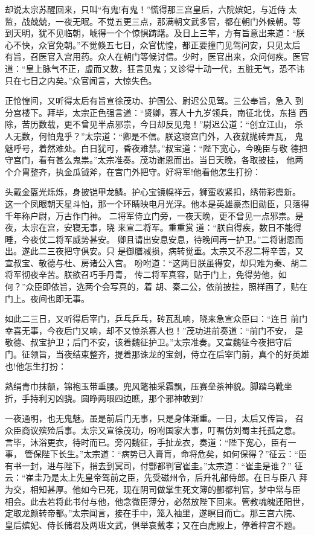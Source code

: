却说太宗苏醒回来，只叫“有鬼!有鬼！”慌得那三宫皇后，六院嫔妃，与近侍
太监，战兢兢，一夜无眠。不觉五更三点，那满朝文武多官，都在朝门外候朝。等
到天明，犹不见临朝，唬得一个个惊惧踌躇。及日上三竿，方有旨意出来道：“朕
心不快，众官免朝。”不觉倏五七日，众官忧惶，都正要撞门见驾问安，只见太后
有旨，召医官入宫用药。众人在朝门等候讨信。少时，医官出来，众问何疾。医官
道：“皇上脉气不正，虚而又数，狂言见鬼；又诊得十动一代，五脏无气，恐不讳
只在七日之内矣。”众官闻言，大惊失色。

正怆惶间，又听得太后有旨宣徐茂功、护国公、尉迟公见驾。三公奉旨，急入
到分宫楼下。拜毕，太宗正色强言道：“贤卿，寡人十九岁领兵，南征北伐，东挡
西除，苦历数载，更不曾见半点邪祟，今日却反见鬼！”尉迟公道：“创立江山，
杀人无数，何怕鬼乎？”太宗道：“卿是不信。朕这寝宫门外，入夜就抛砖弄瓦，
鬼魅呼号，着然难处。白日犹可，昏夜难禁。”叔宝道：“陛下宽心，今晚臣与敬
德把守宫门，看有甚么鬼祟。”太宗准奏。茂功谢恩而出。当日天晚，各取披挂，
他两个介胄整齐，执金瓜钺斧，在宫门外把守。好将军!他看他怎生打扮：

头戴金盔光烁烁，身披铠甲龙鳞。护心宝镜幌祥云，狮蛮收紧扣，绣带彩霞新。
这一个凤眼朝天星斗怕，那一个环睛映电月光浮。他本是英雄豪杰旧勋臣，只落得
千年称户尉，万古作门神。
二将军侍立门旁，一夜天晚，更不曾见一点邪祟。是夜，太宗在宫，安寝无事，晓
来宣二将军。重重赏道：“朕自得疾，数日不能得睡，今夜仗二将军威势甚安。
卿且请出安息安息，待晚间再一护卫。”二将谢恩而出。遂此二三夜把守俱安。只
是御膳减损，病转觉重。太宗又不忍二将辛苦，又宣叔宝、敬德与杜、房诸公入宫。
吩咐道：“这两日朕虽得安，却只难为秦、胡二将军彻夜辛苦。朕欲召巧手丹青，
传二将军真容，贴于门上，免得劳他，如何？”众臣即依旨，选两个会写真的，着
胡、秦二公，依前披挂，照样画了，贴在门上。夜间也即无事。

如此二三日，又听得后宰门，乒乓乒乓，砖瓦乱响，晓来急宣众臣曰：“连日
前门幸喜无事，今夜后门又响，却不又惊杀寡人也！”茂功进前奏道：“前门不安，
是敬德、叔宝护卫；后门不安，该着魏征护卫。”太宗准奏。又宣魏征今夜把守后
门。征领旨，当夜结束整齐，提着那诛龙的宝剑，侍立在后宰门前，真个的好英雄
也!他怎生打扮：

熟绢青巾抹额，锦袍玉带垂腰。兜风氅袖采霜飘，压赛垒荼神貌。脚踏乌靴坐
折，手持利刃凶骁。圆睁两眼四边瞧，那个邪神敢到?

一夜通明，也无鬼魅。虽是前后门无事，只是身体渐重。一日，太后又传旨，
召众臣商议殡殓后事。太宗又宣徐茂功，吩咐国家大事，叮嘱仿刘蜀主托孤之意。
言毕，沐浴更衣，待时而已。旁闪魏征，手扯龙衣，奏道：“陛下宽心，臣有一事，
管保陛下长生。”太宗道：“病势已入膏肓，命将危矣，如何保得？”征云：“臣
有书一封，进与陛下，捎去到冥司，付酆都判官崔圭。”太宗道：“崔圭是谁？”
征云：“崔圭乃是太上先皇帝驾前之臣，先受磁州令，后升礼部侍郎。在日与臣八
拜为交，相知甚厚。他如今已死，现在阴司做掌生死文簿的酆都判官，梦中常与臣
相会。此去若将此书付与他，他念微臣薄分，必然放陛下回来。管教魂魄还阳世，
定取龙颜转帝都。”太宗闻言，接在手中，笼入袖里，遂瞑目而亡。那三宫六院、
皇后嫔妃、侍长储君及两班文武，俱举哀戴孝；又在白虎殿上，停着梓宫不题。

